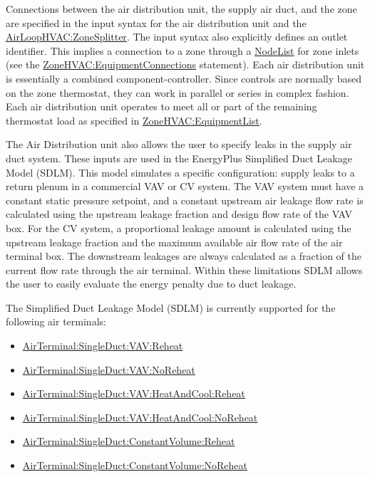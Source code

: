 Connections between the air distribution unit, the supply air duct, and the zone are specified in the input syntax for the air distribution unit and the \hyperref[airloophvaczonesplitter]{AirLoopHVAC:ZoneSplitter}. The input syntax also explicitly defines an outlet identifier. This implies a connection to a zone through a \hyperref[nodelist]{NodeList} for zone inlets (see the \hyperref[zonehvacequipmentconnections]{ZoneHVAC:EquipmentConnections} statement). Each air distribution unit is essentially a combined component-controller. Since controls are normally based on the zone thermostat, they can work in parallel or series in complex fashion. Each air distribution unit operates to meet all or part of the remaining thermostat load as specified in \hyperref[zonehvacequipmentlist]{ZoneHVAC:EquipmentList}.

The Air Distribution unit also allows the user to specify leaks in the supply air duct system. These inputs are used in the EnergyPlus Simplified Duct Leakage Model (SDLM). This model simulates a specific configuration: supply leaks to a return plenum in a commercial VAV or CV system. The VAV system must have a constant static pressure setpoint, and a constant upstream air leakage flow rate is calculated using the upstream leakage fraction and design flow rate of the VAV box. For the CV system, a proportional leakage amount is calculated using the upstream leakage fraction and the maximum available air flow rate of the air terminal box. The downstream leakages are always calculated as a fraction of the current flow rate through the air terminal. Within these limitations SDLM allows the user to easily evaluate the energy penalty due to duct leakage.

The Simplified Duct Leakage Model (SDLM) is currently supported for the following air terminals:

\begin{itemize}
\item
  \hyperref[airterminalsingleductvavreheat]{AirTerminal:SingleDuct:VAV:Reheat}
\item
  \hyperref[airterminalsingleductvavnoreheat]{AirTerminal:SingleDuct:VAV:NoReheat}
\item
  \hyperref[airterminalsingleductvavheatandcoolreheat]{AirTerminal:SingleDuct:VAV:HeatAndCool:Reheat}
\item
  \hyperref[airterminalsingleductvavheatandcoolnoreheat]{AirTerminal:SingleDuct:VAV:HeatAndCool:NoReheat}
\item
  \hyperref[airterminalsingleductconstantvolumereheat]{AirTerminal:SingleDuct:ConstantVolume:Reheat}
\item
  \hyperref[airterminalsingleductconstantvolumenoreheat]{AirTerminal:SingleDuct:ConstantVolume:NoReheat}

\end{itemize}

